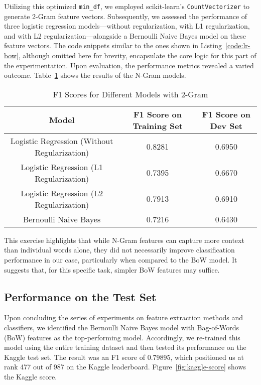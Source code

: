 \documentclass{article}
\begin{document}
Utilizing this optimized \texttt{min\_df}, we employed scikit-learn's \texttt{CountVectorizer} to generate 2-Gram feature vectors. Subsequently, we assessed the performance of three logistic regression models—without regularization, with L1 regularization, and with L2 regularization—alongside a Bernoulli Naive Bayes model on these feature vectors. The code snippets similar to the ones shown in Listing~\ref{code:lr-bow}, although omitted here for brevity, encapsulate the core logic for this part of the experimentation. Upon evaluation, the performance metrics revealed a varied outcome. Table~\ref{tab:results-ngram} shows the results of the N-Gram models.

\begin{table}[h]
    \centering
    \begin{tabular}{|c|c|c|}
        \hline
        \textbf{Model} & \textbf{F1 Score on Training Set} & \textbf{F1 Score on Dev Set} \\
        \hline
        Logistic Regression (Without Regularization) & 0.8281 & 0.6950 \\
        \hline
        Logistic Regression (L1 Regularization) & 0.7395 & 0.6670 \\
        \hline
        Logistic Regression (L2 Regularization) & 0.7913 & 0.6910 \\
        \hline
        Bernoulli Naive Bayes & 0.7216 & 0.6430 \\
        \hline
    \end{tabular}
    \caption{F1 Scores for Different Models with 2-Gram}
    \label{tab:results-ngram}
\end{table}

This exercise highlights that while N-Gram features can capture more context than individual words alone, they did not necessarily improve classification performance in our case, particularly when compared to the BoW model. It suggests that, for this specific task, simpler BoW features may suffice.


\subsection{Performance on the Test Set}

Upon concluding the series of experiments on feature extraction methods and classifiers, we identified the Bernoulli Naive Bayes model with Bag-of-Words (BoW) features as the top-performing model. Accordingly, we re-trained this model using the entire training dataset and then tested its performance on the Kaggle test set. The result was an F1 score of 0.79895, which positioned us at rank 477 out of 987 on the Kaggle leaderboard. Figure~\ref{fig:kaggle-score} shows the Kaggle score.
\end{document}
